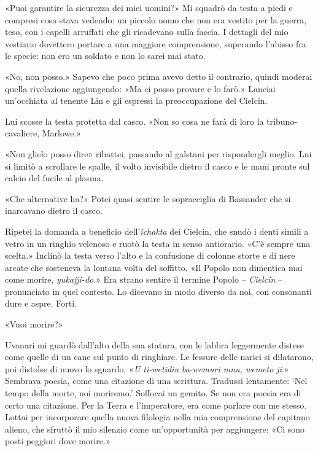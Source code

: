 «Puoi garantire la sicurezza dei miei uomini?» Mi squadrò da testa a
piedi e compresi cosa stava vedendo: un piccolo uomo che non era vestito
per la guerra, teso, con i capelli arruffati che gli ricadevano sulla
faccia. I dettagli del mio vestiario dovettero portare a una maggiore
comprensione, superando l'abisso fra le specie: non ero un soldato e non
lo sarei mai stato.

«No, non posso.» Sapevo che poco prima avevo detto il contrario, quindi
moderai quella rivelazione aggiungendo: «Ma ci posso provare e lo farò.»
Lanciai un'occhiata al tenente Lin e gli espressi la preoccupazione del
Cielcin.

Lui scosse la testa protetta dal casco. «Non so cosa ne farà di loro la
tribuno-cavaliere, Marlowe.»

«Non glielo posso dire» ribattei, passando al galstani per rispondergli
meglio. Lui si limitò a scrollare le spalle, il volto invisibile dietro
il casco e le mani pronte sul calcio del fucile al plasma.

«Che alternative ha?» Potei quasi sentire le sopracciglia di Bassander
che si inarcavano dietro il casco.

Ripetei la domanda a beneficio dell'\emph{ichakta} dei Cielcin, che
snudò i denti simili a vetro in un ringhio velenoso e ruotò la testa in
senso antiorario. «C'è sempre una scelta.» Inclinò la testa verso l'alto
e la confusione di colonne storte e di nere arcate che sosteneva la
lontana volta del soffitto. «Il Popolo non dimentica mai come morire,
\emph{yukajji-do}.» Era strano sentire il termine Popolo --
\emph{Cielcin} -- pronunciato in quel contesto. Lo dicevano in modo
diverso da noi, con consonanti dure e aspre. Forti.

«Vuoi morire?»

Uvanari mi guardò dall'alto della sua statura, con le labbra leggermente
distese come quelle di un cane sul punto di ringhiare. Le fessure delle
narici si dilatarono, poi distolse di nuovo lo sguardo. «\emph{U
	ti-wetidiu ba-wemuri mnu, wemeto ji}.» Sembrava poesia, come una
citazione di una scrittura. Tradussi lentamente:
\label{fileintero-72.xhtml__idTextAnchor006}{}`Nel tempo
della morte, noi moriremo.' Soffocai un gemito. Se non era poesia era di
certo una citazione. Per la Terra e l'imperatore, era come parlare con
me stesso. Lottai per incorporare quella nuova filologia nella mia
comprensione del capitano alieno, che sfruttò il mio silenzio come
un'opportunità per aggiungere: «Ci sono posti peggiori dove morire.»

